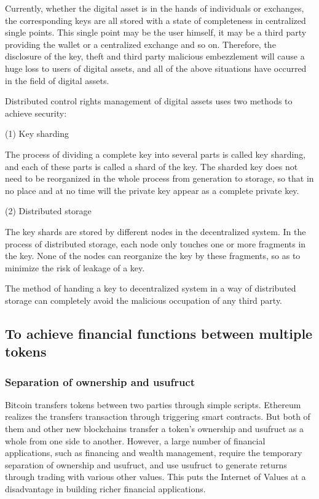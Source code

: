 \documentclass[a4paper,12pt]{article}
\begin{document}
Currently, whether the digital asset is in the hands of individuals or exchanges, the corresponding keys are all stored with a state of completeness in centralized single points. This single point may be the user himself, it may be a third party providing the wallet or a centralized exchange and so on. Therefore, the disclosure of the key, theft and third party malicious embezzlement will cause a huge loss to users of digital assets, and all of the above situations have occurred in the field of digital assets.

Distributed control rights management of digital assets uses two methods to achieve security:

(1) Key sharding

The process of dividing a complete key into several parts is called key sharding, and each of these parts is called a shard of the key. The sharded key does not need to be reorganized in the whole process from generation to storage, so that in no place and at no time will the private key appear as a complete private key.

(2) Distributed storage

The key shards are stored by different nodes in the decentralized system. In the process of distributed storage, each node only touches one or more fragments in the key. None of the nodes can reorganize the key by these fragments, so as to minimize the risk of leakage of a key.

The method of handing a key to decentralized system in a way of distributed storage can completely avoid the malicious occupation of any third party.

\subsection{To achieve financial functions between multiple tokens}

\subsubsection {Separation of ownership and usufruct}

Bitcoin transfers tokens between two parties through simple scripts. Ethereum realizes the transfers transaction through triggering smart contracts. But both of them and other new blockchains transfer a token’s ownership and usufruct as a whole from one side to another. However, a large number of financial applications, such as financing and wealth management, require the temporary separation of ownership and usufruct, and use usufruct to generate returns through trading with various other values. This puts the Internet of Values at a disadvantage in building richer financial applications. 
\end{document}
